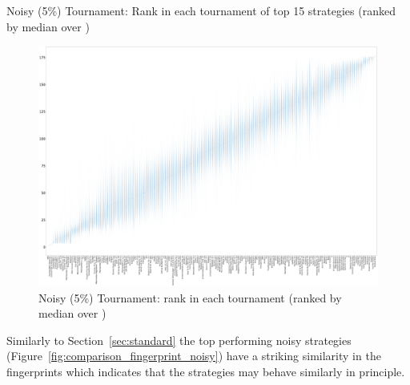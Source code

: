 \documentclass{article}
\begin{document}
\begin{table}[!hbtp]
    \centering
        
        \caption{Noisy (5\%) Tournament: Rank in each tournament
        of top 15 strategies (ranked by median over
        \protecttournaments)}
        \label{tbl:noisy_ranks}
\end{table}

\begin{landscape}
    \begin{figure}[!hbtp]
        \centering
        \includegraphics[width=\paperwidth]{./assets/noisy_ranks_boxplots.pdf}
        \caption{Noisy (5\%) Tournament: rank in each tournament (ranked by
        median over
        \protecttournaments)}
        \label{fig:noisy_ranks_boxplot}
    \end{figure}
\end{landscape}

Similarly to Section~\ref{sec:standard} the top performing noisy strategies
(Figure~\ref{fig:comparison_fingerprint_noisy}) have
a striking similarity in the fingerprints which indicates that the strategies
may behave similarly in principle.
\end{document}
